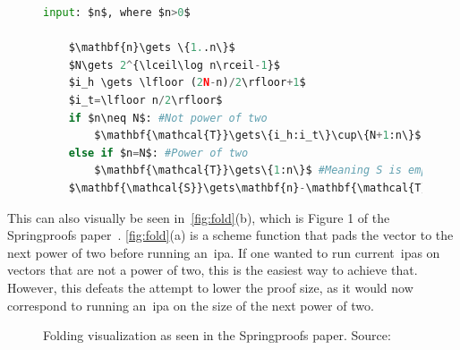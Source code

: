 \begin{figure}[!htb]
    \begin{lstlisting}[language=Python,mathescape=true,label={lst:schemefunc},numbers=right,caption={Scheme function \textbf{\textit{f}} used in CAAUrdleproofs},captionpos=b,frame=single]
    input: $n$, where $n>0$

    $\mathbf{n}\gets \{1..n\}$
    $N\gets 2^{\lceil\log n\rceil-1}$
    $i_h \gets \lfloor (2N-n)/2\rfloor+1$
    $i_t=\lfloor n/2\rfloor$
    if $n\neq N$: #Not power of two
        $\mathbf{\mathcal{T}}\gets\{i_h:i_t\}\cup\{N+1:n\}$
    else if $n=N$: #Power of two
        $\mathbf{\mathcal{T}}\gets\{1:n\}$ #Meaning S is empty
    $\mathbf{\mathcal{S}}\gets\mathbf{n}-\mathbf{\mathcal{T}}$
    \end{lstlisting}
\label{fig:schemefunc}
\end{figure}

This can also visually be seen in~\autoref{fig:fold}(b), which is Figure 1 of the Springproofs paper~\cite{zhang2024springproofs}.
\autoref{fig:fold}(a) is a scheme function that pads the vector to the next power of two before running an~\gls{ipa}.
If one wanted to run current~\glspl{ipa} on vectors that are not a power of two, this is the easiest way to achieve that.
However, this defeats the attempt to lower the proof size, as it would now correspond to running an~\gls{ipa} on the size of the next power of two.

\begin{figure}[!htb]
    \centering
    \qquad
    \caption{Folding visualization as seen in the Springproofs paper. Source:~\cite{zhang2024springproofs}}%
    \label{fig:fold}%
\end{figure}

